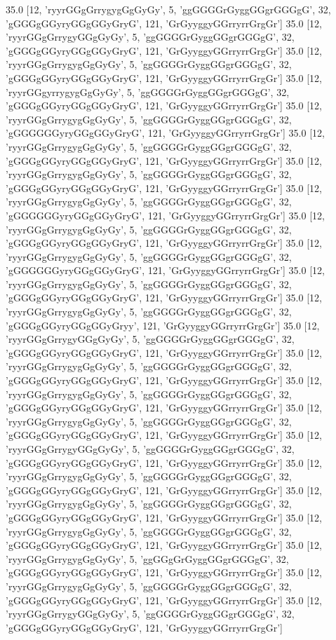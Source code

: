 35.0 [12, 'ryyrGGgGrrygygGgGyGy', 5, 'ggGGGGrGyggGGgrGGGgG', 32, 'gGGGgGGyryGGgGGyGryG', 121, 'GrGyyggyGGrryrrGrgGr']
35.0 [12, 'ryyrGGgGrrygyGGgGyGy', 5, 'ggGGGGrGyggGGgrGGGgG', 32, 'gGGGgGGyryGGgGGyGryG', 121, 'GrGyyggyGGrryrrGrgGr']
35.0 [12, 'ryyrGGgGrrygygGgGyGy', 5, 'ggGGGGrGyggGGgrGGGgG', 32, 'gGGGgGGyryGGgGGyGryG', 121, 'GrGyyggyGGrryrrGrgGr']
35.0 [12, 'ryyrGGgyrrygygGgGyGy', 5, 'ggGGGGrGyggGGgrGGGgG', 32, 'gGGGgGGyryGGgGGyGryG', 121, 'GrGyyggyGGrryrrGrgGr']
35.0 [12, 'ryyrGGgGrrygygGgGyGy', 5, 'ggGGGGrGyggGGgrGGGgG', 32, 'gGGGGGGyryGGgGGyGryG', 121, 'GrGyyggyGGrryrrGrgGr']
35.0 [12, 'ryyrGGgGrrygygGgGyGy', 5, 'ggGGGGrGyggGGgrGGGgG', 32, 'gGGGgGGyryGGgGGyGryG', 121, 'GrGyyggyGGrryrrGrgGr']
35.0 [12, 'ryyrGGgGrrygygGgGyGy', 5, 'ggGGGGrGyggGGgrGGGgG', 32, 'gGGGgGGyryGGgGGyGryG', 121, 'GrGyyggyGGrryrrGrgGr']
35.0 [12, 'ryyrGGgGrrygygGgGyGy', 5, 'ggGGGGrGyggGGgrGGGgG', 32, 'gGGGGGGyryGGgGGyGryG', 121, 'GrGyyggyGGrryrrGrgGr']
35.0 [12, 'ryyrGGgGrrygygGgGyGy', 5, 'ggGGGGrGyggGGgrGGGgG', 32, 'gGGGgGGyryGGgGGyGryG', 121, 'GrGyyggyGGrryrrGrgGr']
35.0 [12, 'ryyrGGgGrrygygGgGyGy', 5, 'ggGGGGrGyggGGgrGGGgG', 32, 'gGGGGGGyryGGgGGyGryG', 121, 'GrGyyggyGGrryrrGrgGr']
35.0 [12, 'ryyrGGgGrrygygGgGyGy', 5, 'ggGGGGrGyggGGgrGGGgG', 32, 'gGGGgGGyryGGgGGyGryG', 121, 'GrGyyggyGGrryrrGrgGr']
35.0 [12, 'ryyrGGgGrrygygGgGyGy', 5, 'ggGGGGrGyggGGgrGGGgG', 32, 'gGGGgGGyryGGgGGyGryy', 121, 'GrGyyggyGGrryrrGrgGr']
35.0 [12, 'ryyrGGgGrrygyGGgGyGy', 5, 'ggGGGGrGyggGGgrGGGgG', 32, 'gGGGgGGyryGGgGGyGryG', 121, 'GrGyyggyGGrryrrGrgGr']
35.0 [12, 'ryyrGGgGrrygygGgGyGy', 5, 'ggGGGGrGyggGGgrGGGgG', 32, 'gGGGgGGyryGGgGGyGryG', 121, 'GrGyyggyGGrryrrGrgGr']
35.0 [12, 'ryyrGGgGrrygygGgGyGy', 5, 'ggGGGGrGyggGGgrGGGgG', 32, 'gGGGgGGyryGGgGGyGryG', 121, 'GrGyyggyGGrryrrGrgGr']
35.0 [12, 'ryyrGGgGrrygygGgGyGy', 5, 'ggGGGGrGyggGGgrGGGgG', 32, 'gGGGgGGyryGGgGGyGryG', 121, 'GrGyyggyGGrryrrGrgGr']
35.0 [12, 'ryyrGGgGrrygyGGgGyGy', 5, 'ggGGGGrGyggGGgrGGGgG', 32, 'gGGGgGGyryGGgGGyGryG', 121, 'GrGyyggyGGrryrrGrgGr']
35.0 [12, 'ryyrGGgGrrygygGgGyGy', 5, 'ggGGGGrGyggGGgrGGGgG', 32, 'gGGGgGGyryGGgGGyGryG', 121, 'GrGyyggyGGrryrrGrgGr']
35.0 [12, 'ryyrGGgGrrygygGgGyGy', 5, 'ggGGGGrGyggGGgrGGGgG', 32, 'gGGGgGGyryGGgGGyGryG', 121, 'GrGyyggyGGrryrrGrgGr']
35.0 [12, 'ryyrGGgGrrygygGgGyGy', 5, 'ggGGGGrGyggGGgrGGGgG', 32, 'gGGGgGGyryGGgGGyGryG', 121, 'GrGyyggyGGrryrrGrgGr']
35.0 [12, 'ryyrGGgGrrygygGgGyGy', 5, 'ggGGgGrGyggGGgrGGGgG', 32, 'gGGGgGGyryGGgGGyGryG', 121, 'GrGyyggyGGrryrrGrgGr']
35.0 [12, 'ryyrGGgGrrygygGgGyGy', 5, 'ggGGGGrGyggGGgrGGGgG', 32, 'gGGGgGGyryGGgGGyGryG', 121, 'GrGyyggyGGrryrrGrgGr']
35.0 [12, 'ryyrGGgGrrygyGGgGyGy', 5, 'ggGGGGrGyggGGgrGGGgG', 32, 'gGGGgGGyryGGgGGyGryG', 121, 'GrGyyggyGGrryrrGrgGr']
